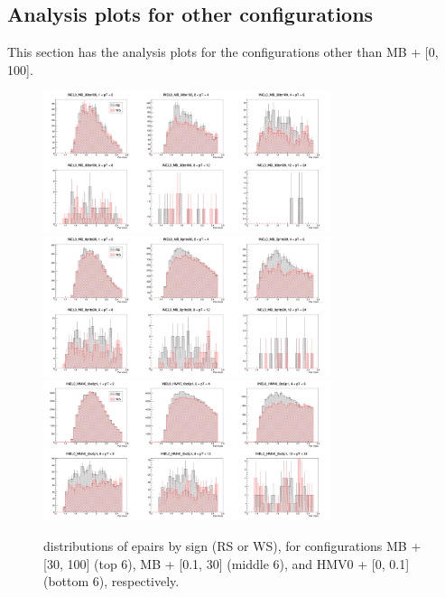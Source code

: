 \begin{appendix}
\clearpage

\section{Analysis plots for other configurations}\label{sec:appB}
This section has the analysis plots for the configurations other than MB + [0, 100].

\vspace{\columnsep}
\begin{figure}[h]
    \centering
    \includegraphics[width=0.75\textwidth]{plots/s2_RSmWS_INEL0_MB_30to100.png} \\\vspace{5pt}
    \includegraphics[width=0.75\textwidth]{plots/s2_RSmWS_INEL0_MB_0p1to30.png} \\\vspace{5pt}
    \includegraphics[width=0.75\textwidth]{plots/s2_RSmWS_INEL0_HMV0_0to0p1.png}
    \caption{\pt distributions of e\Xim pairs by sign (RS or WS), for configurations MB + [30, 100] (top 6),
    MB + [0.1, 30] (middle 6), and HMV0 + [0, 0.1] (bottom 6), respectively.}
    \label{fig:appB_RSWS}
\end{figure}
\clearpage


\end{appendix}
